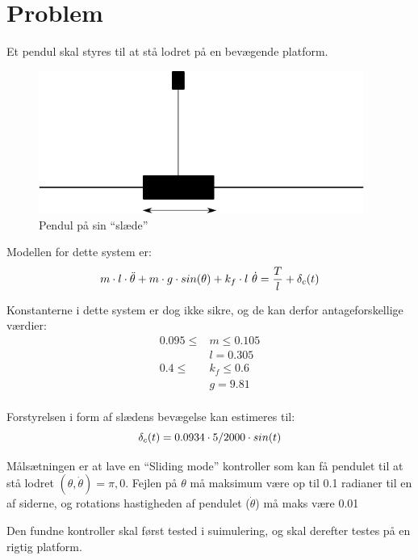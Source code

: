 \chapter{Problem}
Et pendul skal styres til at stå lodret på en bevægende platform.
\begin{figure}[htbp]
        \centering
        \includegraphics[width=0.95\textwidth]{pendul.png}
        \caption{Pendul på sin ``slæde''}
        \label{fig:label}
\end{figure}
Modellen for dette system er:
\begin{equation}
        m\cdot l \cdot \Ddot{\theta} + m \cdot g \cdot sin(\theta) + k_f \cdot l \ \dot{\theta} = \frac{T}{l} + \delta_c(t)
\end{equation}

Konstanterne i dette system er dog ikke sikre, og de kan derfor antageforskellige værdier:
\begin{equation}
        \begin{split}
                0.095 \leq &m \leq 0.105 \\
                &l = 0.305 \\
                0.4 \leq &k_f \leq 0.6 \\
                &g = 9.81 \\
        \end{split}
\end{equation}

Forstyrelsen i form af slædens bevægelse kan estimeres til:
\begin{equation}
        \delta_c(t) = 0.0934 \cdot 5/2000 \cdot sin(t)
\end{equation}

Målsætningen er at lave en ``Sliding mode'' kontroller som kan få pendulet til at stå lodret $(\theta, \dot{\theta})= \pi, 0$. Fejlen på $\theta$ må maksimum være op til 0.1 radianer til en af siderne, og rotations hastigheden af pendulet ($\dot{\theta}$) må maks være 0.01

Den fundne kontroller skal først tested i suimulering, og skal derefter testes på en rigtig platform.